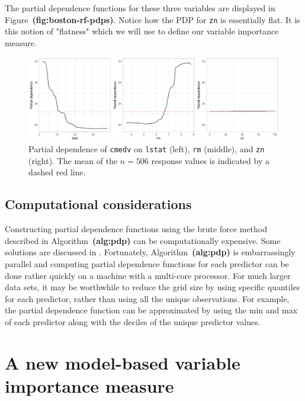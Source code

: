 \documentclass[12pt]{article}
\def\code#1{\texttt{#1}}
\def\ref#1{\textbf{(#1)}}
\begin{document}
The partial dependence functions for these three variables are displayed in Figure~\ref{fig:boston-rf-pdps}. Notice how the PDP for \code{zn} is essentially flat. It is this notion of "flatness" which we will use to define our variable importance measure.
\begin{figure}[!htb]
  \label{boston-rf-pdps}
  \centering
  \includegraphics[width=1.0\textwidth]{boston-rf-pdps}
  \caption{Partial dependence of \code{cmedv} on \code{lstat} (left), \code{rm} (middle), and \code{zn} (right). The mean of the $n = 506$ response values is indicated by a dashed red line.}
\end{figure}


\subsection{Computational considerations}

Constructing partial dependence functions using the brute force method described in Algorithm~\ref{alg:pdp} can be computationally expensive. Some solutions are discussed in \citet{pdp-greenwell-2017}. Fortunately, Algorithm~\ref{alg:pdp} is embarrassingly parallel and computing partial dependence functions for each predictor can be done rather quickly on a machine with a multi-core processor. For much larger data sets, it may be worthwhile to reduce the grid size by using specific quantiles for each predictor, rather than using all the unique observations. For example, the partial dependence function can be approximated by using the min and max of each predictor along with the deciles of the unique predictor values.


\section{A new model-based variable importance measure}
\label{sec:new}
\end{document}
